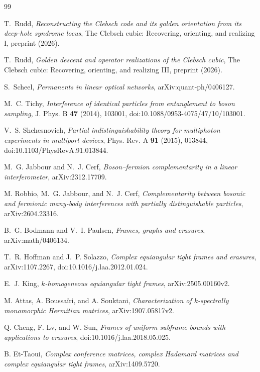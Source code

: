 \documentclass[11pt]{article}
\theoremstyle{remark}
\begin{document}
\begingroup
\raggedright
\small
\begin{thebibliography}{99}
\setlength{\itemsep}{0pt}

T.~Rudd,
\emph{Reconstructing the Clebsch code and its golden orientation from its
deep-hole syndrome locus},
The Clebsch cubic: Recovering, orienting, and realizing I, preprint (2026).

T.~Rudd,
\emph{Golden descent and operator realizations of the Clebsch cubic},
The Clebsch cubic: Recovering, orienting, and realizing III, preprint (2026).

S.~Scheel,
\emph{Permanents in linear optical networks},
arXiv:quant-ph/0406127.

M.~C. Tichy,
\emph{Interference of identical particles from entanglement to boson
sampling},
J. Phys. B \textbf{47} (2014), 103001,
doi:10.1088/0953-4075/47/10/103001.

V.~S. Shchesnovich,
\emph{Partial indistinguishability theory for multiphoton experiments in
multiport devices},
Phys. Rev. A \textbf{91} (2015), 013844,
doi:10.1103/PhysRevA.91.013844.

M.~G. Jabbour and N.~J. Cerf,
\emph{Boson--fermion complementarity in a linear interferometer},
arXiv:2312.17709.

M. Robbio, M.~G. Jabbour, and N.~J. Cerf,
\emph{Complementarity between bosonic and fermionic many-body interferences
with partially distinguishable particles},
arXiv:2604.23316.

B.~G. Bodmann and V.~I. Paulsen,
\emph{Frames, graphs and erasures},
arXiv:math/0406134.

T.~R. Hoffman and J.~P. Solazzo,
\emph{Complex equiangular tight frames and erasures},
arXiv:1107.2267, doi:10.1016/j.laa.2012.01.024.

E.~J. King,
\emph{\(k\)-homogeneous equiangular tight frames},
arXiv:2505.00160v2.

M. Attas, A. Boussa\"iri, and A. Souktani,
\emph{Characterization of \(k\)-spectrally monomorphic Hermitian matrices},
arXiv:1907.05817v2.

Q. Cheng, F. Lv, and W. Sun,
\emph{Frames of uniform subframe bounds with applications to erasures},
doi:10.1016/j.laa.2018.05.025.

B. Et-Taoui,
\emph{Complex conference matrices, complex Hadamard matrices and complex
equiangular tight frames},
arXiv:1409.5720.


\end{thebibliography}
\end{document}
